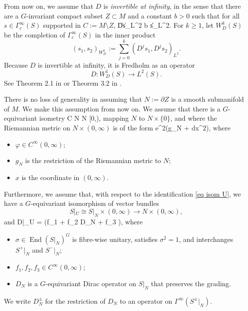 \documentclass[11pt]{article}
\theoremstyle{plain}
\theoremstyle{definition}
\theoremstyle{remark}
\numberwithin{equation}{section}
\DeclareMathOperator{\End}{End}
\begin{document}
From now on, we assume that $D$ is \emph{invertible at infinity}, in the sense that there are a $G$-invariant compact subset $Z\subset M$ and a constant $b>0$ such that for all $s \in \Gamma^{\infty}_c(S)$ supported in $C:= M \setminus Z$,
\|Ds\|_{L^2} \geq b \|s\|_{L^2}.
\eeq
For $k\geq 1$, let $W^k_D(S)$ be the completion of $\Gamma^{\infty}_c(S)$ in the inner product
\[
(s_1, s_2)_{W^k_D} := \sum_{j=0}^k(D^js_1, D^j s_2)_{L^2}.
\]
Because $D$ is invertible at infinity, it is Fredholm as an operator
\[
D\colon W^1_D(S) \to L^2(S).
\]
See Theorem 2.1 in \cite{Anghel93b} or Theorem 3.2 in \cite{Gromov83}.


There is no loss of generality in assuming that $N:= \partial Z$ is a smooth submanifold of $M$. We make this assumption from now on. We assume that 
there is a $G$-equivariant isometry
C \cup N \cong N \times [0,\infty),
\eeq
mapping $N$ to $N \times \{0\}$, and
where the Riemannian metric on $N \times (0,\infty)$ is of the form
 e^{2\varphi}(g_N + dx^2),
 \eeq
 where
\begin{itemize}
\item $\varphi \in C^{\infty}(0,\infty)$;
\item $g_N$ is the restriction of the Riemannian metric to $N$;
\item $x$ is the coordinate in $(0,\infty)$.
\end{itemize}


Furthermore, we assume that, with respect to the identification \eqref{eq isom U}, we have a $G$-equivariant isomorphism of vector bundles
\[
S|_U \cong S|_N \times (0,\infty) \to N \times (0,\infty),
\]
and
D|_U = \sigma \left(f_1  + f_2 D_N + f_3 \right),
\eeq
where
\begin{itemize}
\item $\sigma \in \End(S|_N)^G$ is fibre-wise unitary, satisfies $\sigma^2 = 1$, and interchanges $S^+|_N$ and $S^-|_N$;
\item $f_1, f_2, f_3 \in C^{\infty}(0,\infty)$;
\item $D_N$ is a $G$-equivariant Dirac operator on $S|_N$ that preserves the grading.
\end{itemize}
We write $D_N^{\pm}$ for the restriction of $D_N$ to an operator on $\Gamma^{\infty}(S^{\pm}|_N)$.
\end{document}
